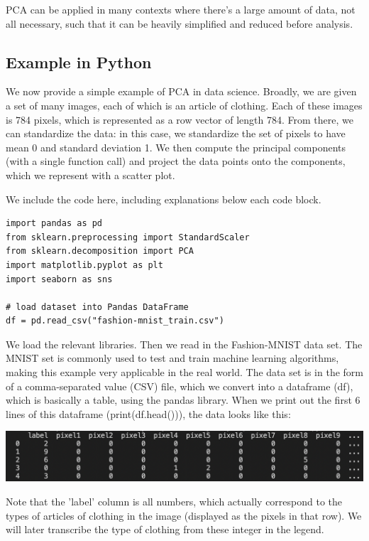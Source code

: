 \documentclass{article}
\begin{document}
\noindent PCA can be applied in many contexts where there's a large amount of data, not all necessary, such that it can be heavily simplified and reduced before analysis.

\subsection{Example in Python}

\noindent We now provide a simple example of PCA in data science. Broadly, we are given a set of many images, each of which is an article of clothing. Each of these images is 784 pixels, which is represented as a row vector of length 784. From there, we can standardize the data: in this case, we standardize the set of pixels to have mean 0 and standard deviation 1. We then compute the principal components (with a single function call) and project the data points onto the components, which we represent with a scatter plot.

\vspace{1mm}
\noindent We include the code here, including explanations below each code block.


\begin{lstlisting}
import pandas as pd
from sklearn.preprocessing import StandardScaler
from sklearn.decomposition import PCA
import matplotlib.pyplot as plt
import seaborn as sns

# load dataset into Pandas DataFrame
df = pd.read_csv("fashion-mnist_train.csv")
\end{lstlisting}

\noindent We load the relevant libraries. Then we read in the Fashion-MNIST data set. The MNIST set is commonly used to test and train machine learning algorithms, making this example very applicable in the real world. The data set is in the form of a comma-separated value (CSV) file, which we convert into a dataframe (df), which is basically a table, using the pandas library. When we print out the first 6 lines of this dataframe (print(df.head())), the data looks like this: 

\vspace{2mm}
\includegraphics[scale=0.5]{images/df_head.png}

\vspace{2mm}
\noindent Note that the 'label' column is all numbers, which actually correspond to the types of articles of clothing in the image (displayed as the pixels in that row). We will later transcribe the type of clothing from these integer in the legend.
\end{document}
